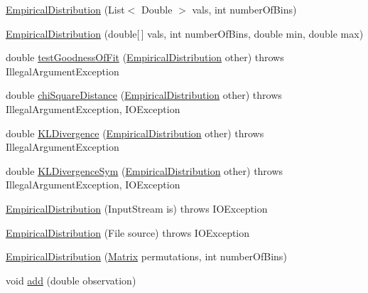 \begin{DoxyCompactItemize}
\item 
\hyperlink{classbroad_1_1core_1_1math_1_1_empirical_distribution_ae44b04ac2c70fff78920fb4e38d0b8f1}{Empirical\+Distribution} (List$<$ Double $>$ vals, int number\+Of\+Bins)
\item 
\hyperlink{classbroad_1_1core_1_1math_1_1_empirical_distribution_a68b437be79fc9903cc0a13bd7a89ce1a}{Empirical\+Distribution} (double\mbox{[}$\,$\mbox{]} vals, int number\+Of\+Bins, double min, double max)
\item 
double \hyperlink{classbroad_1_1core_1_1math_1_1_empirical_distribution_a627aa8895e29be03a2912197b10626fb}{test\+Goodness\+Of\+Fit} (\hyperlink{classbroad_1_1core_1_1math_1_1_empirical_distribution}{Empirical\+Distribution} other)  throws Illegal\+Argument\+Exception 
\item 
double \hyperlink{classbroad_1_1core_1_1math_1_1_empirical_distribution_aee3d9ed2c0e1745431fa438ca0add5c1}{chi\+Square\+Distance} (\hyperlink{classbroad_1_1core_1_1math_1_1_empirical_distribution}{Empirical\+Distribution} other)  throws Illegal\+Argument\+Exception, I\+O\+Exception 
\item 
double \hyperlink{classbroad_1_1core_1_1math_1_1_empirical_distribution_a62b44a9083bcf30aaaa59f808df862d3}{K\+L\+Divergence} (\hyperlink{classbroad_1_1core_1_1math_1_1_empirical_distribution}{Empirical\+Distribution} other)  throws Illegal\+Argument\+Exception 
\item 
double \hyperlink{classbroad_1_1core_1_1math_1_1_empirical_distribution_adca6b67cf78a6ae8b46768fa52e9a725}{K\+L\+Divergence\+Sym} (\hyperlink{classbroad_1_1core_1_1math_1_1_empirical_distribution}{Empirical\+Distribution} other)  throws Illegal\+Argument\+Exception, I\+O\+Exception 
\item 
\hyperlink{classbroad_1_1core_1_1math_1_1_empirical_distribution_ac4ee46ae32fbeefb835946307213aa6f}{Empirical\+Distribution} (Input\+Stream is)  throws I\+O\+Exception 
\item 
\hyperlink{classbroad_1_1core_1_1math_1_1_empirical_distribution_aa9efb0277ae0edafb289892a20cf494e}{Empirical\+Distribution} (File source)  throws I\+O\+Exception 
\item 
\hyperlink{classbroad_1_1core_1_1math_1_1_empirical_distribution_a7df9435462e8438d6e9ef7293e3d5451}{Empirical\+Distribution} (\hyperlink{class_jama_1_1_matrix}{Matrix} permutations, int number\+Of\+Bins)
\item 
void \hyperlink{classbroad_1_1core_1_1math_1_1_empirical_distribution_ae7b64a09e14a81b186e17003376183bb}{add} (double observation)

\end{DoxyCompactItemize}
